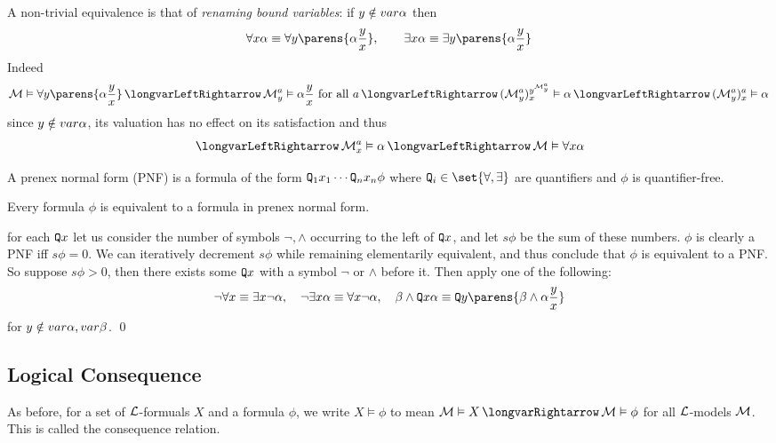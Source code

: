 A non-trivial equivalence is that of {\it renaming bound variables}: if $y\notin{\sl var}\alpha$ then
$$ \forall x\alpha \equiv \forall y\parens{\alpha\frac yx},\qquad \exists x\alpha\equiv\exists y\parens{\alpha\frac yx} $$
Indeed
$$ \c M\vDash\forall y\parens{\alpha\frac yx} \iff \c M^a_y\vDash\alpha\frac yx\hbox{ for all $a$} \iff (\c M^a_y)^{y^{\c M^a_y}}_x\vDash\alpha \iff (\c M^a_y)^a_x\vDash\alpha $$
since $y\notin{\sl var}\alpha$, its valuation has no effect on its satisfaction and thus
$$ \iff \c M^a_x\vDash\alpha \iff \c M\vDash\forall x\alpha $$

\bdefn

    A {\emphcolor prenex normal form} (PNF) is a formula of the form ${\tt Q}_1x_1\cdots{\tt Q}_nx_n\phi$ where $\Q_i\in\set{{\forall},{\exists}}$ are quantifiers and $\phi$ is quantifier-free.

\edefn

\bthrm

    Every formula $\phi$ is equivalent to a formula in prenex normal form.

\ethrm

\Proof for each ${\tt Q} x$ let us consider the number of symbols $\neg,\land$ occurring to the left of ${\tt Q} x$, and let $s\phi$ be the sum of these numbers.
$\phi$ is clearly a PNF iff $s\phi=0$.
We can iteratively decrement $s\phi$ while remaining elementarily equivalent, and thus conclude that $\phi$ is equivalent to a PNF.
So suppose $s\phi>0$, then there exists some ${\tt Q} x$ with a symbol $\neg$ or $\land$ before it.
Then apply one of the following:
$$ \neg\forall x\equiv\exists x\neg\alpha,\quad \neg\exists x\alpha\equiv\forall x\neg\alpha,\quad \beta\land\Q x\alpha\equiv\Q y\parens{\beta\land\alpha\frac yx} $$
for $y\notin{\sl var}\alpha,{\sl var}\beta$.
\qed

\subsection{Logical Consequence}

\bdefn

    As before, for a set of ${\cal L}$-formuals $X$ and a formula $\phi$, we write $X\vDash\phi$ to mean $\c M\vDash X\implies\c M\vDash\phi$ for all ${\cal L}$-models ${\cal M}$.
    This is called the {\emphcolor consequence relation}.

\edefn

